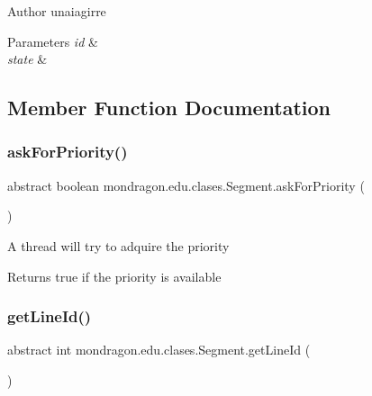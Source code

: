 \begin{DoxyAuthor}{Author}
unaiagirre 
\end{DoxyAuthor}

\begin{DoxyParams}{Parameters}
{\em id} & \\
\hline
{\em state} & \\
\hline
\end{DoxyParams}


\subsection{Member Function Documentation}
\mbox{\label{classmondragon_1_1edu_1_1clases_1_1_segment_a0ee7818c127f5117a723b8fece868030}} 
\subsubsection{\texorpdfstring{askForPriority()}{askForPriority()}}
{\footnotesize\ttfamily abstract boolean mondragon.\+edu.\+clases.\+Segment.\+ask\+For\+Priority (\begin{DoxyParamCaption}{ }\end{DoxyParamCaption})\hspace{0.3cm}{\ttfamily [abstract]}}

A thread will try to adquire the priority

\begin{DoxyReturn}{Returns}
true if the priority is available 
\end{DoxyReturn}
\mbox{\label{classmondragon_1_1edu_1_1clases_1_1_segment_af905b954e40e0c3d5b58673b03b972cc}} 
\subsubsection{\texorpdfstring{getLineId()}{getLineId()}}
{\footnotesize\ttfamily abstract int mondragon.\+edu.\+clases.\+Segment.\+get\+Line\+Id (\begin{DoxyParamCaption}{ }\end{DoxyParamCaption})\hspace{0.3cm}{\ttfamily [abstract]}}

